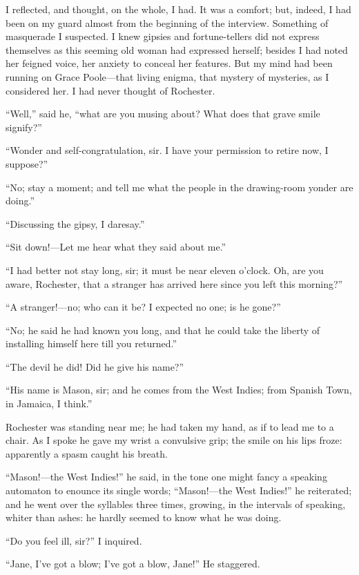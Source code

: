 I reflected, and thought, on the whole, I had. It was a comfort; but,
indeed, I had been on my guard almost from the beginning of the
interview. Something of masquerade I suspected. I knew gipsies and
fortune-tellers did not express themselves as this seeming old woman had
expressed herself; besides I had noted her feigned voice, her anxiety to
conceal her features. But my mind had been running on Grace
Poole---that living enigma, that mystery of mysteries, as I considered
her. I had never thought of \Mr{} Rochester.

\enquote{Well,} said he, \enquote{what are you musing about? What does
that grave smile signify?}

\enquote{Wonder and self-congratulation, sir. I have your permission to
retire now, I suppose?}

\enquote{No; stay a moment; and tell me what the people in the
drawing-room yonder are doing.}

\enquote{Discussing the gipsy, I daresay.}

\enquote{Sit down!---Let me hear what they said about me.}

\enquote{I had better not stay long, sir; it must be near eleven
o'clock. Oh, are you aware, \Mr{} Rochester, that a stranger has arrived
here since you left this morning?}

\enquote{A stranger!---no; who can it be? I expected no one; is he
gone?}

\enquote{No; he said he had known you long, and that he could take the
liberty of installing himself here till you returned.}

\enquote{The devil he did! Did he give his name?}

\enquote{His name is Mason, sir; and he comes from the West Indies; from
Spanish Town, in Jamaica, I think.}

\Mr{} Rochester was standing near me; he had taken my hand, as if to lead
me to a chair. As I spoke he gave my wrist a convulsive grip; the smile
on his lips froze: apparently a spasm caught his breath.

\enquote{Mason!---the West Indies!} he said, in the tone one might fancy
a speaking automaton to enounce its single words; \enquote{Mason!---the
West Indies!} he reiterated; and he went over the syllables three times,
growing, in the intervals of speaking, whiter than ashes: he hardly
seemed to know what he was doing.

\enquote{Do you feel ill, sir?} I inquired.

\enquote{Jane, I've got a blow; I've got a blow, Jane!} He staggered.

